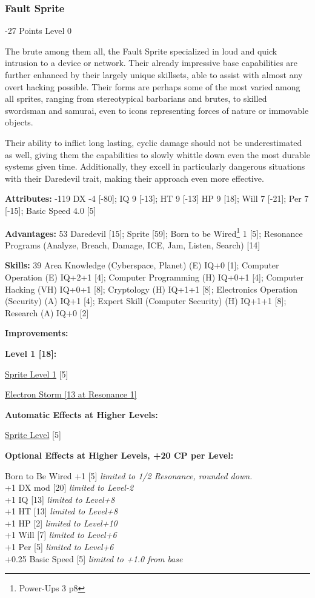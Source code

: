 \begin{multicols*}{3}
\subsubsection{Fault Sprite}
\begin{flushright}
	-27 Points Level 0
\end{flushright}

The brute among them all, the Fault Sprite specialized in loud and quick intrusion to a device or network. Their already impressive base capabilities are further enhanced by their largely unique skillsets, able to assist with almost any overt hacking possible. Their forms are perhaps some of the most varied among all sprites, ranging from stereotypical barbarians and brutes, to skilled swordsman and samurai, even to icons representing forces of nature or immovable objects.

Their ability to inflict long lasting, cyclic damage should not be underestimated as well, giving them the capabilities to slowly whittle down even the most durable systems given time. Additionally, they excell in particularly dangerous situations with their Daredevil trait, making their approach even more effective.

\textbf{Attributes:} -119
DX -4 [-80]; IQ 9 [-13]; HT 9 [-13]
HP 9 [18]; Will 7 [-21]; Per 7 [-15]; Basic Speed 4.0 [5]

\textbf{Advantages:} 53
Daredevil [15]; Sprite [59]; Born to be Wired\footnote{Power-Ups 3 p8} 1 [5]; Resonance Programs (Analyze, Breach, Damage, ICE, Jam, Listen, Search) [14]

\textbf{Skills:} 39
Area Knowledge (Cyberspace, Planet) (E) IQ+0 [1]; Computer Operation (E) IQ+2+1 [4]; Computer Programming (H) IQ+0+1 [4]; Computer Hacking (VH) IQ+0+1 [8]; Cryptology (H) IQ+1+1 [8]; Electronics Operation (Security) (A) IQ+1 [4]; Expert Skill (Computer Security) (H) IQ+1+1 [8]; Research (A) IQ+0 [2]

\textbf{ Improvements:}

\textbf{Level 1 [18]:}

\hyperref[sprite_level]{Sprite Level 1} [5]

\hyperref[electron_storm]{Electron Storm [13 at Resonance 1]}

\textbf{Automatic Effects at Higher Levels:}

\hyperref[sprite_level]{Sprite Level} [5]

\textbf{Optional Effects at Higher Levels, +20 CP per Level:}

Born to Be Wired +1 [5] \textit{limited to 1/2 Resonance, rounded down.}\\
+1 DX mod [20] \textit{limited to Level-2}\\
+1 IQ [13] \textit{limited to Level+8}\\
+1 HT [13] \textit{limited to Level+8}\\
+1 HP [2] \textit{limited to Level+10}\\
+1 Will [7] \textit{limited to Level+6}\\
+1 Per [5] \textit{limited to Level+6}\\
+0.25 Basic Speed [5] \textit{limited to +1.0 from base}\\



\end{multicols*}
